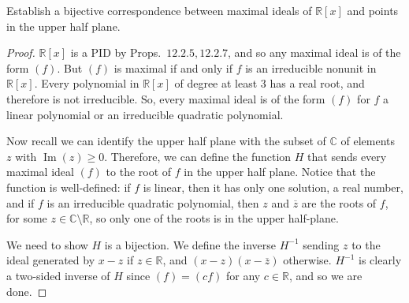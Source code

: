 \documentclass[12pt]{article}
\theoremstyle{remark}
\begin{document}
\begin{problem}
  Establish a bijective correspondence between maximal ideals of $\mathbb{R}[x]$ and points in the upper half plane.
\end{problem}
\begin{proof}
  $\mathbb{R}[x]$ is a PID by Props.~$12.2.5,12.2.7$, and so any maximal ideal is of the form $(f)$. But $(f)$ is maximal if and only if $f$ is an irreducible nonunit in $\mathbb{R}[x]$. Every polynomial in $\mathbb{R}[x]$ of degree at least 3 has a real root, and therefore is not irreducible. So, every maximal ideal is of the form $(f)$ for $f$ a linear polynomial or an irreducible quadratic polynomial.
\par Now recall we can identify the upper half plane with the subset of $\mathbb{C}$ of elements $z$ with $\operatorname{Im}(z)\geq 0$. Therefore, we can define the function $H$ that sends every maximal ideal $(f)$ to the root of $f$ in the upper half plane. Notice that the function is well-defined: if $f$ is linear, then it has only one solution, a real number, and if $f$ is an irreducible quadratic polynomial, then $z$ and $\overline{z}$ are the roots of $f$, for some $z\in\mathbb{C}\setminus\mathbb{R}$, so only one of the roots is in the upper half-plane.
\par We need to show $H$ is a bijection. We define the inverse $H^{-1}$ sending $z$ to the ideal generated by $x-z$ if $z \in \mathbb{R}$, and $(x-z)(x-\overline{z})$ otherwise. $H^{-1}$ is clearly a two-sided inverse of $H$ since $(f) = (cf)$ for any $c \in \mathbb{R}$, and so we are done.
\end{proof}
\end{document}
